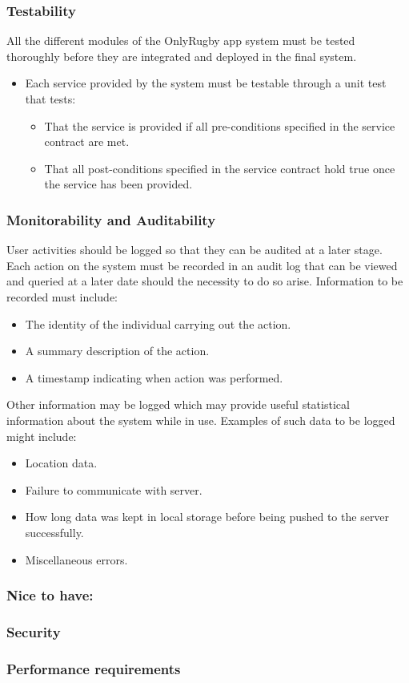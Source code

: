 	\subsubsection*{Testability}
	All the different modules of the OnlyRugby app system must be tested thoroughly before they are integrated and deployed in the final system.
	\begin{itemize}
		\item Each service provided by the system must be testable through a unit test that tests:
		\begin{itemize}
			\item That the service is provided if all pre-conditions specified in the service contract are met.
			\item That all post-conditions specified in the service contract hold true once the service has been provided.
		\end{itemize}
	\end{itemize}
	
	\subsubsection*{Monitorability and Auditability}
	User activities should be logged so that they can be audited at a later stage. Each action on the system must be recorded in an audit log that can be viewed and queried at a later date should the necessity to do so arise.
	Information to be recorded must include:
	\begin{itemize}
		\item The identity of the individual carrying out the action.
		\item A summary description of the action.
		\item A timestamp indicating when action was performed.
	\end{itemize}
	
	Other information may be logged which may provide useful statistical information about the system while in use. Examples of such data to be logged might include:
	\begin{itemize}
		\item Location data.
		\item Failure to communicate with server.
		\item How long data was kept in local storage before being pushed to the server successfully.
		\item Miscellaneous errors.
	\end{itemize}
	
	\subsubsection{Nice to have:}
	
	\subsubsection*{Security}		
	
	\subsubsection*{Performance requirements}	
